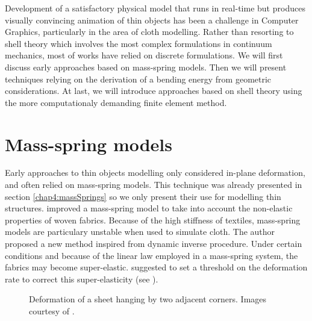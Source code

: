 Development of a satisfactory physical model that runs in real-time but produces visually convincing animation of thin objects has been a challenge in Computer Graphics, particularly in the area of cloth modelling. Rather than resorting to shell theory which involves the most complex formulations in continuum mechanics, most of works have relied on discrete formulations. We will first discuss early approaches based on mass-spring models. Then we will present techniques relying on the derivation of a bending energy from geometric considerations. At last, we will introduce approaches based on shell theory using the more computationaly demanding finite element method.

		
\section{Mass-spring models}

Early approaches to thin objects modelling only considered in-plane deformation, and often relied on mass-spring models. This technique was already presented in section \ref{chap4:massSprings} so we only present their use for modelling thin structures. \cite{Provot95} improved a mass-spring model to take into account the non-elastic properties of woven fabrics. Because of the high stiffness of textiles, mass-spring models are particulary unstable when used to simulate cloth. The author proposed a new method inspired from dynamic inverse procedure. Under certain conditions and because of the linear law employed in a mass-spring system, the fabrics may become super-elastic. \citeauthor{Provot95} suggested to set a threshold on the deformation rate to correct this super-elasticity (see ). 
%
\begin{figure}[ht]
\centering 
{}
\hfill 
{}
\hfill 
{}
\caption{Deformation of a sheet hanging by two adjacent corners. Images courtesy of \cite{Provot95}.}
\label{chap7:fig-sheet}
\end{figure}

